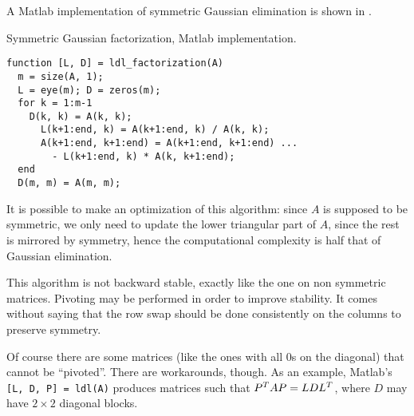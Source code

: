 \documentclass[ComputationalMathematics.tex]{subfiles}
\begin{document}
A Matlab implementation of symmetric Gaussian elimination is shown in .

\begin{center}
\begin{minipage}{.9\linewidth}
  \begin{algorithm}[H]
    \caption{Symmetric Gaussian factorization, Matlab implementation.}\label{algo:23novsymgauss}
    \begin{verbatim}
function [L, D] = ldl_factorization(A)
  m = size(A, 1);
  L = eye(m); D = zeros(m);
  for k = 1:m-1
    D(k, k) = A(k, k);
	  L(k+1:end, k) = A(k+1:end, k) / A(k, k);
	  A(k+1:end, k+1:end) = A(k+1:end, k+1:end) ...
        - L(k+1:end, k) * A(k, k+1:end);
  end
  D(m, m) = A(m, m);
    \end{verbatim}
  \end{algorithm}
\end{minipage}
\end{center}
\vspace{0.5cm}

It is possible to make an optimization of this algorithm: since $A$ is supposed to be symmetric, we only need to update the lower triangular part of $A$, since the rest is mirrored by symmetry, hence the computational complexity is half that of Gaussian elimination.

This algorithm is not backward stable, exactly like the one on non symmetric matrices. Pivoting may be performed in order to improve stability. It comes without saying that the row swap should be done consistently on the columns to preserve symmetry.

Of course there are some matrices (like the ones with all $0$s on the diagonal) that cannot be ``pivoted''. There are workarounds, though. As an example, Matlab's \texttt{[L, D, P] = ldl(A)} produces matrices such that ${P}^{T}AP=LD{L}^{T}$, where $D$ may have $2\times 2$ diagonal blocks.

\end{document}
